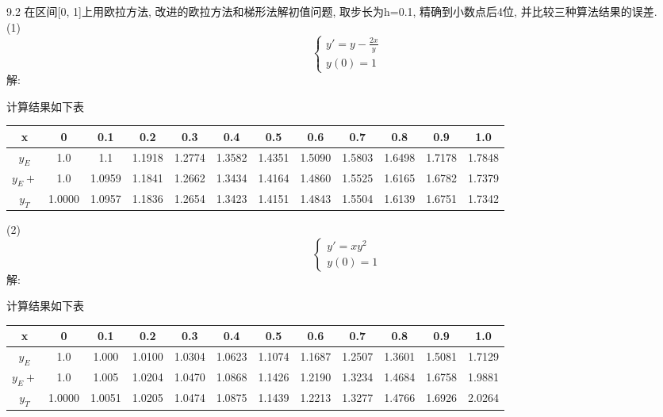 \documentclass[a4paper, 10pt]{article}
\begin{document}
\begin{CJK}{UTF8}{gbsn}
9.2
在区间[0, 1]上用欧拉方法, 改进的欧拉方法和梯形法解初值问题, 取步长为h=0.1, 精确到小数点后4位, 并比较三种算法结果的误差. \\

(1)
\begin{equation*}
	\begin{cases}
		y' = y-\frac{2x}{y} \\
		y(0) = 1
	\end{cases}
\end{equation*}
解:

计算结果如下表
\begin{table}[h]
	\begin{tabular}{c | c c c c c c c c c c c}
		\hline
		x      & 0      & 0.1    & 0.2    & 0.3    & 0.4    & 0.5    & 0.6    & 0.7    & 0.8    & 0.9    & 1.0    \\ 
		\hline
		$y_E$  & 1.0    & 1.1    & 1.1918 & 1.2774 & 1.3582 & 1.4351 & 1.5090 & 1.5803 & 1.6498 & 1.7178 & 1.7848 \\
		\hline
		$y_E+$ & 1.0    & 1.0959 & 1.1841 & 1.2662 & 1.3434 & 1.4164 & 1.4860 & 1.5525 & 1.6165 & 1.6782 & 1.7379 \\
		\hline
		$y_T$  & 1.0000 & 1.0957 & 1.1836 & 1.2654 & 1.3423 & 1.4151 & 1.4843 & 1.5504 & 1.6139 & 1.6751 & 1.7342 \\
		\hline
	\end{tabular}
\end{table}

(2)
\begin{equation*}
	\begin{cases}
		y' = xy^2 \\
		y(0) = 1
	\end{cases}
\end{equation*}
解:

计算结果如下表
\begin{table}[h]
	\begin{tabular}{c | c c c c c c c c c c c}
		\hline
		x      & 0      & 0.1    & 0.2    & 0.3    & 0.4    & 0.5    & 0.6    & 0.7    & 0.8    & 0.9    & 1.0    \\
		\hline
		$y_E$  & 1.0    & 1.000  & 1.0100 & 1.0304 & 1.0623 & 1.1074 & 1.1687 & 1.2507 & 1.3601 & 1.5081 & 1.7129 \\
		\hline
		$y_E+$ & 1.0    & 1.005  & 1.0204 & 1.0470 & 1.0868 & 1.1426 & 1.2190 & 1.3234 & 1.4684 & 1.6758 & 1.9881 \\
		\hline
		$y_T$  & 1.0000 & 1.0051 & 1.0205 & 1.0474 & 1.0875 & 1.1439 & 1.2213 & 1.3277 & 1.4766 & 1.6926 & 2.0264 \\
		\hline
	\end{tabular}
\end{table}


\end{CJK}
\end{document}
